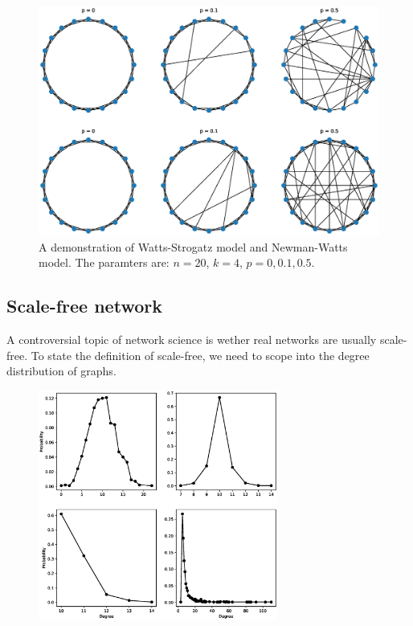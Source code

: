 \documentclass[12pt]{article}
\begin{document}
\begin{figure}[ht]
    \includegraphics[width = \textwidth]{small_world_network_model.eps}
    \centering
    \caption{A demonstration of Watts-Strogatz model and Newman-Watts model. The paramters are: $n=20$, $k=4$, $p=0,0.1,0.5$.}
    \label{fig:small_world_models}
\end{figure}

\subsection{Scale-free network}
A controversial topic of network science is wether real networks are usually scale-free. To state the definition of scale-free, we need to scope into the degree distribution of graphs.\\
\begin{figure}[ht]
    \includegraphics[width=0.7\textwidth]{degree_distribution.eps}
    \centering
    \caption{}
\end{figure}
\end{document}
